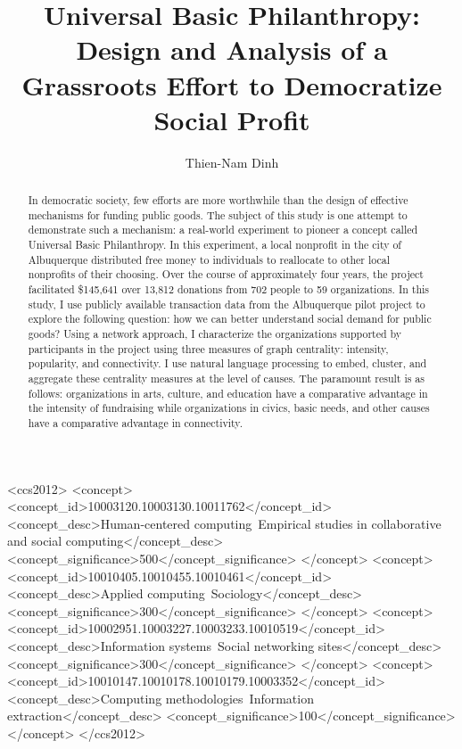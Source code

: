 \documentclass[sigconf]{acmart}
\begin{document}
\title{Universal Basic Philanthropy: Design and Analysis of a Grassroots Effort to Democratize Social Profit}

\author{Thien-Nam Dinh}

\begin{abstract}
  In democratic society, few efforts are more worthwhile than the design of effective mechanisms for funding public goods.
  The subject of this study is one attempt to demonstrate such a mechanism: a real-world experiment to pioneer a concept called Universal Basic Philanthropy.
  In this experiment, a local nonprofit in the city of Albuquerque distributed free money to individuals to reallocate to other local nonprofits of their choosing.
  Over the course of approximately four years, the project facilitated \$145,641 over 13,812 donations from 702 people to 59 organizations.
  In this study, I use publicly available transaction data from the Albuquerque pilot project to explore the following question: how we can better understand social demand for public goods?
  Using a network approach, I characterize the organizations supported by participants in the project using three measures of graph centrality: intensity, popularity, and connectivity.
  I use natural language processing to embed, cluster, and aggregate these centrality measures at the level of causes.
  The paramount result is as follows: organizations in arts, culture, and education have a comparative advantage in the intensity of fundraising while organizations in civics, basic needs, and other causes have a comparative advantage in connectivity.
\end{abstract}

\begin{CCSXML}
<ccs2012>
   <concept>
       <concept_id>10003120.10003130.10011762</concept_id>
       <concept_desc>Human-centered computing~Empirical studies in collaborative and social computing</concept_desc>
       <concept_significance>500</concept_significance>
       </concept>
   <concept>
       <concept_id>10010405.10010455.10010461</concept_id>
       <concept_desc>Applied computing~Sociology</concept_desc>
       <concept_significance>300</concept_significance>
       </concept>
   <concept>
       <concept_id>10002951.10003227.10003233.10010519</concept_id>
       <concept_desc>Information systems~Social networking sites</concept_desc>
       <concept_significance>300</concept_significance>
       </concept>
   <concept>
       <concept_id>10010147.10010178.10010179.10003352</concept_id>
       <concept_desc>Computing methodologies~Information extraction</concept_desc>
       <concept_significance>100</concept_significance>
       </concept>
 </ccs2012>
\end{CCSXML}
\end{document}

